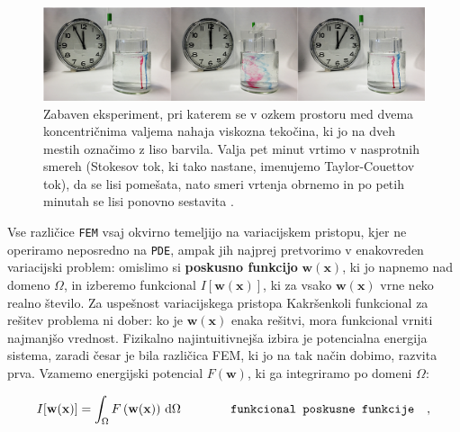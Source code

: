 \begin{figure}[ht]
	\includegraphics[width = 1\textwidth]{Slike/TaylorCouette}
	\caption{Zabaven eksperiment, pri katerem se v ozkem prostoru med dvema koncentričnima valjema nahaja viskozna tekočina, ki jo na dveh mestih označimo z liso barvila. Valja pet minut vrtimo v nasprotnih smereh (Stokesov tok, ki tako nastane, imenujemo Taylor-Couettov tok), da se lisi pomešata, nato smeri vrtenja obrnemo in po petih minutah se lisi ponovno sestavita \cite{Wiki-StokesFlow}.}
	\label{fig:TaylorCouette}
	\vspace{-0.2cm}
\end{figure}

Vse različice \texttt{FEM} vsaj okvirno temeljijo na variacijskem pristopu, kjer ne operiramo neposredno na \texttt{PDE}, ampak jih najprej pretvorimo v enakovreden variacijski problem: omislimo si \textbf{poskusno funkcijo} $\mathbf{w}(\mathbf{x})$, ki jo napnemo nad domeno $\Omega$, in izberemo funkcional $I[\mathbf{w}(\mathbf{x})]$, ki za vsako $\mathbf{w}(\mathbf{x})$ vrne neko realno število. Za uspešnost variacijskega pristopa Kakršenkoli funkcional za rešitev problema ni dober: ko je $\mathbf{w}(\mathbf{x})$ enaka rešitvi, mora funkcional vrniti najmanjšo vrednost. Fizikalno najintuitivnejša izbira je potencialna energija sistema, zaradi česar je bila različica FEM, ki jo na tak način dobimo, razvita prva. Vzamemo energijski potencial $F\left(\mathbf{w}\right)$, ki ga integriramo po domeni $\Omega$:

\setlength{\textheight}{26.5cm}
\pagebreak
\setlength{\topmargin}{1.6cm}			%
\setlength{\headheight}{0.0cm}
\setlength{\headsep}{0.0cm}			%
\fancyhf{}
\fancyfoot[C]{\thepage}
\begin{equation}
	I[\mathbf{w}(\mathbf{x})] = \int_{\Omega} F\left(\mathbf{w}(\mathbf{x})\right) \, \mathrm{d} \Omega \hspace{1.4cm} \texttt{funkcional poskusne funkcije} \quad ,
	\label{eq:GeneralFunctional}
\end{equation}

